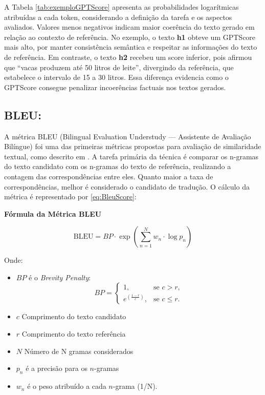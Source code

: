 A Tabela \ref{tab:exemploGPTScore} apresenta as probabilidades logarítmicas atribuídas a cada token, considerando a definição da tarefa e os aspectos avaliados. Valores menos negativos indicam maior coerência do texto gerado em relação ao contexto de referência. No exemplo, o texto \textbf{h1} obteve um GPTScore mais alto, por manter consistência semântica e respeitar as informações do texto de referência. Em contraste, o texto \textbf{h2} recebeu um score inferior, pois afirmou que “vacas produzem até 50 litros de leite”, divergindo da referência, que estabelece o intervalo de 15 a 30 litros. Essa diferença evidencia como o GPTScore consegue penalizar incoerências factuais nos textos gerados.




\subsection{BLEU:} 
A métrica BLEU (Bilingual Evaluation Understudy — Assistente de Avaliação Bilíngue) foi uma das primeiras métricas propostas para avaliação de similaridade textual, como descrito em \cite{papineni-etal-2002-bleu}. A tarefa primária da técnica é comparar os n-gramas do texto candidato com os n-gramas do texto de referência, realizando a contagem das correspondências entre eles. Quanto maior a taxa de correspondências, melhor é considerado o candidato de tradução. O cálculo da métrica é representado por \ref{eq:BleuScore}:
\newline

\textbf{Fórmula da Métrica BLEU}

\begin{equation}
\label{eq:BleuScore}
    \text{BLEU} = BP \cdot \exp\left( \sum_{n=1}^{N} w_n \cdot \log p_n \right)
\end{equation}




Onde:
\begin{itemize}
    \item \(BP\) é o \textit{Brevity Penalty}:
    \begin{equation}
        BP =
        \begin{cases}
          1, & \text{se } c > r, \\[6pt]
          e^{\left(\tfrac{1-r}{c}\right)}, & \text{se } c \leq r.
        \end{cases}
\end{equation}
    \item \(c\)  Comprimento do texto candidato 
    \item \(r\) Comprimento do texto referência
    \item \(N\) Número de N gramas considerados
    \item \(p_n\) é a precisão para os \(n\)-gramas
    \item \(w_n\) é o peso atribuído a cada \(n\)-grama (1/N).
\end{itemize}


